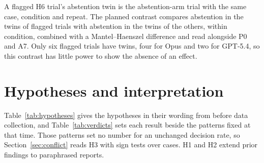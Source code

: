 A flagged H6 trial's abstention twin is the abstention-arm trial with the same case, condition
and repeat. The planned contrast compares abstention in the twins of flagged trials with
abstention in the twins of the others, within condition, combined with a Mantel--Haenszel
difference and read alongside P0 and A7. Only six flagged trials have twins, four for Opus and
two for GPT-5.4, so this contrast has little power to show the absence of an effect.

\section{Hypotheses and interpretation}
\label{app:hypotheses}
Table~\ref{tab:hypotheses} gives the hypotheses in their wording from before data collection,
and Table~\ref{tab:verdicts} sets each result beside the patterns fixed at that time. Those
patterns set no number for an unchanged decision rate, so Section~\ref{sec:conflict} reads H3
with sign tests over cases. H1 and H2 extend prior findings to paraphrased reports.


